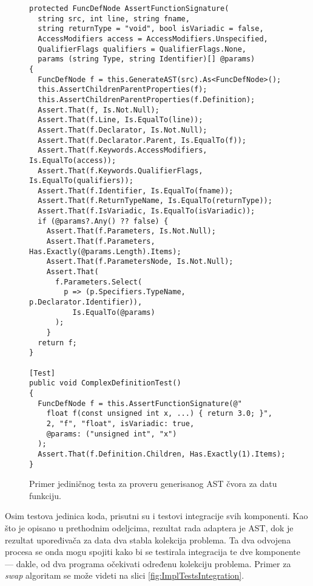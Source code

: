 \begin{figure}[h!]
\centering
\begin{lstlisting}
protected FuncDefNode AssertFunctionSignature(
  string src, int line, string fname, 
  string returnType = "void", bool isVariadic = false, 
  AccessModifiers access = AccessModifiers.Unspecified,
  QualifierFlags qualifiers = QualifierFlags.None, 
  params (string Type, string Identifier)[] @params) 
{
  FuncDefNode f = this.GenerateAST(src).As<FuncDefNode>();
  this.AssertChildrenParentProperties(f);
  this.AssertChildrenParentProperties(f.Definition);
  Assert.That(f, Is.Not.Null);
  Assert.That(f.Line, Is.EqualTo(line));
  Assert.That(f.Declarator, Is.Not.Null);
  Assert.That(f.Declarator.Parent, Is.EqualTo(f));
  Assert.That(f.Keywords.AccessModifiers, Is.EqualTo(access));
  Assert.That(f.Keywords.QualifierFlags, Is.EqualTo(qualifiers));
  Assert.That(f.Identifier, Is.EqualTo(fname));
  Assert.That(f.ReturnTypeName, Is.EqualTo(returnType));
  Assert.That(f.IsVariadic, Is.EqualTo(isVariadic));
  if (@params?.Any() ?? false) {
    Assert.That(f.Parameters, Is.Not.Null);
    Assert.That(f.Parameters, Has.Exactly(@params.Length).Items);
    Assert.That(f.ParametersNode, Is.Not.Null);
    Assert.That(
      f.Parameters.Select(
        p => (p.Specifiers.TypeName, p.Declarator.Identifier)), 
          Is.EqualTo(@params)
      );
    }
  return f;
}

[Test]
public void ComplexDefinitionTest() 
{
  FuncDefNode f = this.AssertFunctionSignature(@"
    float f(const unsigned int x, ...) { return 3.0; }", 
    2, "f", "float", isVariadic: true, 
    @params: ("unsigned int", "x")
  );
  Assert.That(f.Definition.Children, Has.Exactly(1).Items);
}
\end{lstlisting}
\caption{Primer jediničnog testa za proveru generisanog AST čvora za datu funkciju.}
\label{fig:ImplTestsUnit}
\end{figure}

Osim testova jedinica koda, prisutni su i testovi integracije svih komponenti. Kao što je opisano u prethodnim odeljcima, rezultat rada adaptera je AST, dok je rezultat upoređivača za data dva stabla kolekcija problema. Ta dva odvojena procesa se onda mogu spojiti kako bi se testirala integracija te dve komponente --- dakle, od dva programa očekivati određenu kolekciju problema. Primer za \emph{swap} algoritam se može videti na slici \ref{fig:ImplTestsIntegration}.

